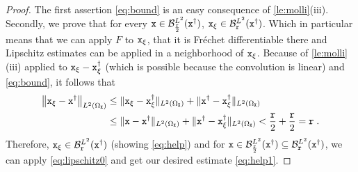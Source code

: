 \documentclass[10pt]{article}
\numberwithin{equation}{section}
\theoremstyle{nonumberplain}
\newtheorem{proof}{Proof}
\newcommand{\norm}[1]{\left\|#1\right\|}
\newcommand{\norms}[1]{\|#1\|}
\newcommand{\X}{{\tt X}}
\newcommand{\x}{{\tt x}}
\newcommand{\xdag}{\x^\dagger}
\begin{document}
\begin{proof}
	The first assertion \autoref{eq:bound} is an easy consequence of \autoref{le:molli}(iii). 
	Secondly, we prove that for every $\x \in \mathcal{B}_{\frac{\tt r}{2}}^{L^2}(\xdag)$, 
	$\x_\xi \in \mathcal{B}_{{\tt r}}^{L^2}(\xdag)$. Which in particular means that we can apply $F$ to $\x_\xi$, that it is Fr\'echet differentiable there and Lipschitz estimates can be applied in a neighborhood of $\x_\xi$. Because of \autoref{le:molli} (iii) applied to $\x_\xi-\xdag_\xi$ (which is possible because the convolution is linear) and \autoref{eq:bound}, it follows that
	\begin{equation*}
		\begin{aligned}
			\norm{\x_\xi-\xdag}_{L^2(\Omega_\X)} &\leq \norms{\x_\xi-\xdag_\xi}_{L^2(\Omega_\X)} + \norms{\xdag-\xdag_\xi}_{L^2(\Omega_\X)} \\
			&\leq \norms{\x-\xdag}_{L^2(\Omega_\X)} + \norms{\xdag-\xdag_\xi}_{L^2(\Omega_\X)} < \frac{\tt r}{2} + \frac{\tt r}{2} = {\tt r}\;.
		\end{aligned}
	\end{equation*} 
	Therefore, $\x_\xi \in \mathcal{B}_{\tt r}^{L^2}(\xdag)$ (showing \autoref{eq:help}) and for $\x \in \mathcal{B}_{\frac{\tt r}{2}}^{L^2}(\xdag) \subseteq \mathcal{B}_{\tt r}^{L^2}(\xdag)$, we can apply \autoref{eq:lipschitz0} and get our desired estimate \autoref{eq:help1}.
\end{proof}
\end{document}
